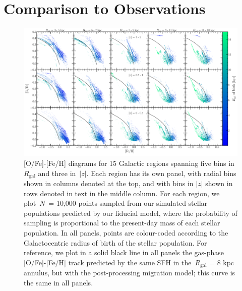 \documentclass[draft2.tex]{subfiles}
\begin{document}
 

\section{Comparison to Observations} 
\label{sec:obs_comp} 

\begin{figure} 
\centering 
\includegraphics[scale = 0.28]{ofe_feh_densitymap.pdf} 
\caption{[O/Fe]-[Fe/H] diagrams for 15 Galactic regions spanning five bins in 
$R_\text{gal}$ and three in~$\left|z\right|$. Each region has its own panel, 
with radial bins shown in columns denoted at the top, and with bins in 
$\left|z\right|$ shown in rows denoted in text in the middle column. For each 
region, we plot~$N$~= 10,000 points sampled from our simulated stellar 
populations predicted by our fiducial model, where the probability of 
sampling is proportional to the present-day mass of each stellar population. 
In all panels, points are colour-coded according to the Galactocentric radius 
of birth of the stellar population. For reference, we plot in a solid black 
line in all panels the gas-phase [O/Fe]-[Fe/H] track predicted by the same 
SFH in the~$R_\text{gal}$ = 8 kpc annulus, but with the post-processing 
migration model; this curve is the same in all panels. } 
\label{fig:ofe_feh_diagram} 
\end{figure} 
\end{document}
